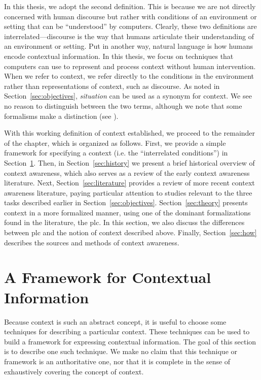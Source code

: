 In this thesis, we adopt the second definition. This is because we are not directly concerned with human discourse but rather with conditions of an environment or setting that can be ``understood'' by computers. Clearly, these two definitions are interrelated---discourse is the way that humans articulate their understanding of an environment or setting. Put in another way, natural language is how humans encode contextual information. In this thesis, we focus on techniques that computers can use to represent and process context without human intervention. When we refer to context, we refer directly to the conditions in the environment rather than representations of context, such as discourse. As noted in Section~\ref{sec:objectives}, \emph{situation} can be used as a synonym for context. We see no reason to distinguish between the two terms, although we note that some formalisms make a distinction (see \cite{akman1996steps}).

With this working definition of context established, we proceed to the remainder of the chapter, which is organized as follows. First, we provide a simple framework for specifying a context (i.e. the ``interrelated conditions'') in Section~\ref{sec:framework}. Then, in Section~\ref{sec:history} we present a brief historical overview of context awareness, which also serves as a review of the early context awareness literature. Next, Section~\ref{sec:literature} provides a review of more recent context awareness literature, paying particular attention to studies relevant to the three tasks described earlier in Section~\ref{sec:objectives}. Section~\ref{sec:theory} presents context in a more formalized manner, using one of the dominant formalizations found in the literature, the \gls{plc}. In this section, we also discuss the differences between \gls{plc} and the notion of context described above. Finally, Section~\ref{sec:how} describes the sources and methods of context awareness.

\section{A Framework for Contextual Information}
\label{sec:framework}

Because context is such an abstract concept, it is useful to choose some techniques for describing a particular context. These techniques can be used to build a framework for expressing contextual information. The goal of this section is to describe one such technique. We make no claim that this technique or framework is an authoritative one, nor that it is complete in the sense of exhaustively covering the concept of context.


